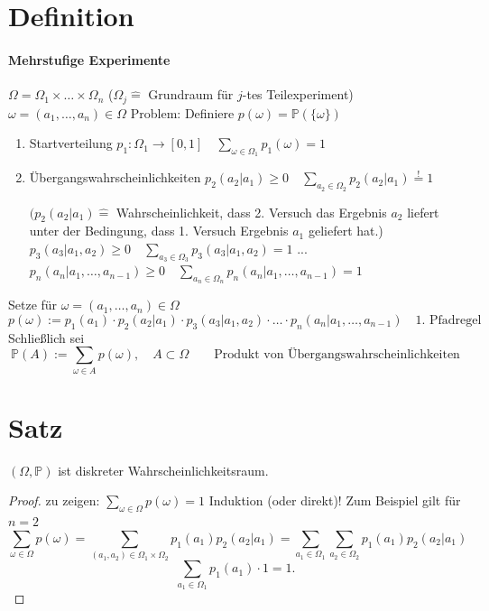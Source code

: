 \documentclass[a4paper,11pt,notitlepage]{report}
\newcommand{\Prim}{{\ensuremath{\mathbb{P}}}}
\begin{document}
\section{Definition}
\paragraph{Mehrstufige Experimente}
$\Omega = \Omega_1 \times \ldots \times \Omega_n$ ($\Omega_j \hat{=}$ Grundraum für $j$-tes Teilexperiment)
\newline
$\omega = (a_1, \ldots, a_n) \in \Omega$
\newline
Problem: Definiere $p(\omega) = \Prim(\{\omega\})$
\begin{enumerate}
	\item Startverteilung $p_1 \colon \Omega_1 \rightarrow [0,1] \quad \sum\limits_{\omega \in \Omega_1}{p_1(\omega)} = 1$
	\item Übergangswahrscheinlichkeiten $p_2(a_2 | a_1) \geq 0 \quad \sum\limits_{a_2 \in \Omega_2}{p_2(a_2|a_1)} \overset{!}{=} 1$ 
	
	$(p_2(a_2|a_1) \hat{=}$ Wahrscheinlichkeit, dass 2. Versuch das Ergebnis $a_2$ liefert unter der Bedingung, dass 1. Versuch Ergebnis $a_1$ geliefert hat.)
	\newline
	$p_3(a_3|a_1,a_2) \geq 0 \quad \sum\limits_{a_3 \in \Omega_3}{p_3(a_3|a_1,a_2)} = 1$
	\newline	
	...
	\newline
	$p_n(a_n | a_1, \ldots, a_{n-1}) \geq 0 \quad \sum\limits_{a_n \in \Omega_n}{p_n(a_n|a_1, \ldots, a_{n-1})} = 1$
\end{enumerate}
Setze für $\omega = (a_1, \ldots, a_n) \in \Omega$
$$p(\omega) := p_1(a_1) \cdot p_2(a_2|a_1) \cdot p_3(a_3|a_1,a_2) \cdot \ldots \cdot p_n(a_n|a_1,\ldots,a_{n-1}) \quad \text{1. Pfadregel}$$
Schließlich sei
$$\Prim(A) := \sum\limits_{\omega \in A}{p(\omega)}, \quad A \subset \Omega \qquad \text{Produkt von Übergangswahrscheinlichkeiten}$$

\section{Satz}
$(\Omega, \Prim)$ ist diskreter Wahrscheinlichkeitsraum.

\begin{proof}
	zu zeigen: $\sum\limits_{\omega \in \Omega}{p(\omega)} = 1$
	\newline
	Induktion (oder direkt)! Zum Beispiel gilt für $n=2$
	$$\sum\limits_{\omega \in \Omega}{p(\omega)} = \sum\limits_{(a_1,a_2) \in \Omega_1 \times \Omega_2}{p_1(a_1) p_2(a_2|a_1)} = \sum\limits_{a_1 \in \Omega_1}{\sum\limits_{a_2 \in \Omega_2}{p_1(a_1) p_2(a_2|a_1)}}$$
	$$\sum\limits_{a_1 \in \Omega_1}{p_1(a_1) \cdot 1} = 1.$$
\end{proof}
\end{document}
